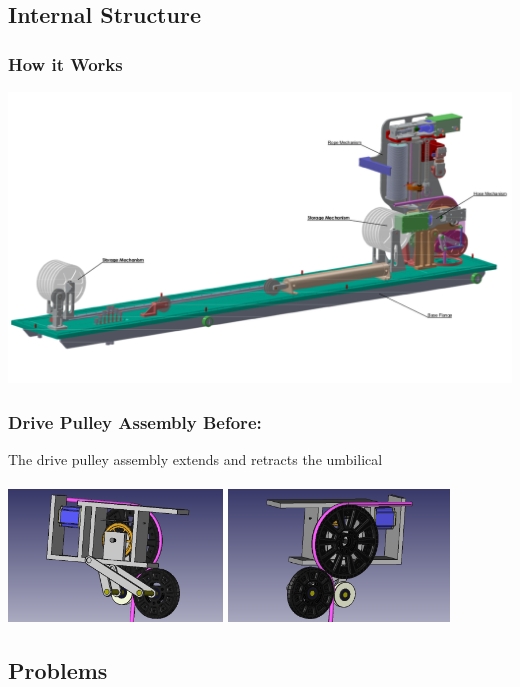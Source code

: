 \documentclass{beamer}
\begin{document}
\subsection{Internal Structure}
\begin{frame}
\frametitle{How it Works}
\centering\includegraphics[width=1\linewidth]{scehm}
\end{frame}
\begin{frame}
\frametitle{Drive Pulley Assembly Before:}
The drive pulley assembly extends and retracts the umbilical \\~\\
\centering\includegraphics[trim = 20mm 0mm 20mm 0mm, height=3.5cm]{original1}
\centering\includegraphics[trim = 20mm 0mm 20mm 0mm, height=3.5cm]{original2}
\end{frame}

\subsection{Problems}
\end{document}
